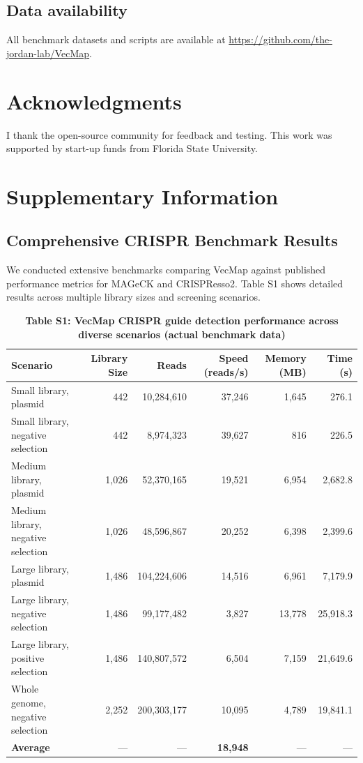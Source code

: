 \documentclass[12pt]{article}
\begin{document}
\subsection{Data availability}

All benchmark datasets and scripts are available at \url{https://github.com/the-jordan-lab/VecMap}.

\section{Acknowledgments}

I thank the open-source community for feedback and testing. This work was supported by start-up funds from Florida State University.




\newpage
\section*{Supplementary Information}

\subsection*{Comprehensive CRISPR Benchmark Results}

We conducted extensive benchmarks comparing VecMap against published performance metrics for MAGeCK and CRISPResso2. Table S1 shows detailed results across multiple library sizes and screening scenarios.

\begin{table}[H]
\centering
\caption{\textbf{Table S1: VecMap CRISPR guide detection performance across diverse scenarios (actual benchmark data)}}
\begin{tabular}{lrrrrr}
\toprule
\textbf{Scenario} & \textbf{Library Size} & \textbf{Reads} & \textbf{Speed (reads/s)} & \textbf{Memory (MB)} & \textbf{Time (s)} \\
\midrule
Small library, plasmid & 442 & 10,284,610 & 37,246 & 1,645 & 276.1 \\
Small library, negative selection & 442 & 8,974,323 & 39,627 & 816 & 226.5 \\
Medium library, plasmid & 1,026 & 52,370,165 & 19,521 & 6,954 & 2,682.8 \\
Medium library, negative selection & 1,026 & 48,596,867 & 20,252 & 6,398 & 2,399.6 \\
Large library, plasmid & 1,486 & 104,224,606 & 14,516 & 6,961 & 7,179.9 \\
Large library, negative selection & 1,486 & 99,177,482 & 3,827 & 13,778 & 25,918.3 \\
Large library, positive selection & 1,486 & 140,807,572 & 6,504 & 7,159 & 21,649.6 \\
Whole genome, negative selection & 2,252 & 200,303,177 & 10,095 & 4,789 & 19,841.1 \\
\midrule
\textbf{Average} & --- & --- & \textbf{18,948} & --- & --- \\
\bottomrule
\end{tabular}
\end{table}
\end{document}
